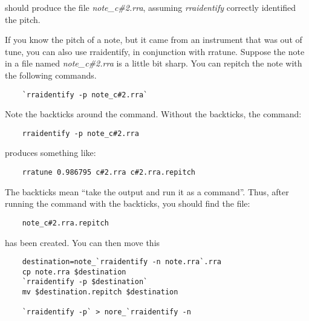 \documentclass{article}
\begin{document}
should produce the file {\it note\_c\#2.rra},
assuming {\it rraidentify} correctly
identified the pitch.

If you know the pitch of a note, but it came from an instrument that
was out of tune, you can also use rraidentify, in conjunction with
rratune. Suppose the note in a file named {\it note\_c\#2.rra} is 
a little bit sharp. You can repitch the note with the following commands.

\begin{verbatim}
    `rraidentify -p note_c#2.rra`
\end{verbatim}

Note the backticks around the command. Without the backticks,
the command:
    
\begin{verbatim}
    rraidentify -p note_c#2.rra
\end{verbatim}

produces something like:

\begin{verbatim}
    rratune 0.986795 c#2.rra c#2.rra.repitch
\end{verbatim}

The backticks mean ``take the output and run it as a command''. Thus,
after running the command with the backticks, you should find the
file:

\begin{verbatim}
    note_c#2.rra.repitch
\end{verbatim}

has been created. You can then move this 

\begin{verbatim}
    destination=note_`rraidentify -n note.rra`.rra
    cp note.rra $destination
    `rraidentify -p $destination`
    mv $destination.repitch $destination

    `rraidentify -p` > nore_`rraidentify -n
\end{verbatim}
\end{document}
